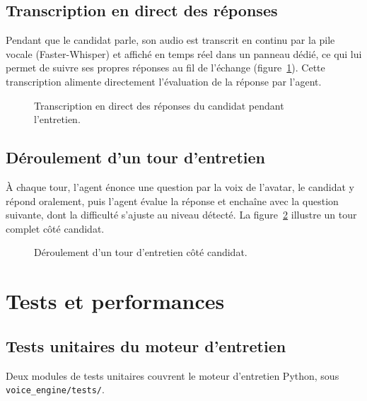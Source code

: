 \subsection{Transcription en direct des réponses}

Pendant que le candidat parle, son audio est transcrit en continu par la pile vocale (Faster-Whisper) et affiché en temps réel dans un panneau dédié, ce qui lui permet de suivre ses propres réponses au fil de l'échange (figure~\ref{fig:transcription}). Cette transcription alimente directement l'évaluation de la réponse par l'agent.

\begin{figure}[H]
  \centering
  \caption{Transcription en direct des réponses du candidat pendant l'entretien.}
  \label{fig:transcription}
\end{figure}

\subsection{Déroulement d'un tour d'entretien}

À chaque tour, l'agent énonce une question par la voix de l'avatar, le candidat y répond oralement, puis l'agent évalue la réponse et enchaîne avec la question suivante, dont la difficulté s'ajuste au niveau détecté. La figure~\ref{fig:interview-qa} illustre un tour complet côté candidat.

\begin{figure}[H]
  \centering
  \caption{Déroulement d'un tour d'entretien côté candidat.}
  \label{fig:interview-qa}
\end{figure}

\section{Tests et performances}

\subsection{Tests unitaires du moteur d'entretien}

Deux modules de tests unitaires couvrent le moteur d'entretien Python, sous
\texttt{voice\_\allowbreak engine/\allowbreak tests/}.

